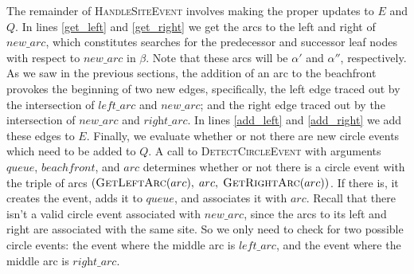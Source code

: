 \documentclass[12pt,twoside]{reedthesis}
\begin{document}
    The remainder of \textsc{HandleSiteEvent} involves making the proper updates to $E$ and $Q$. In lines \ref{get_left} and \ref{get_right} we get the arcs to the left and right of $\textit{new\_arc}$, which constitutes searches for the predecessor and successor leaf nodes with respect to  $\textit{new\_arc}$ in $\beta$. Note that these arcs will be $\alpha'$ and $\alpha''$, respectively. As we saw in the previous sections, the addition of an arc to the beachfront provokes the beginning of two new edges, specifically, the left edge traced out by the intersection of $\textit{left\_arc}$ and $\textit{new\_arc}$; and the right edge traced out by the intersection of $\textit{new\_arc}$ and $\textit{right\_arc}$. In lines \ref{add_left} and \ref{add_right} we add these edges to $E$. Finally, we evaluate whether or not there are new circle events which need to be added to $Q$. A call to \textsc{DetectCircleEvent} with arguments $queue$, $beachfront$, and $arc$ determines whether or not there is a circle event with the triple of arcs $(\textsc{GetLeftArc}(arc),\;arc,\;\textsc{GetRightArc}(arc))$. If there is, it creates the event, adds it to $queue$, and associates it with $arc$. Recall that there isn't a valid circle event associated with $\textit{new\_arc}$, since the arcs to its left and right are associated with the same site. So we only need to check for two possible circle events: the event where the middle arc is $\textit{left\_arc}$, and the event where the middle arc is $\textit{right\_arc}$.\par
\end{document}
